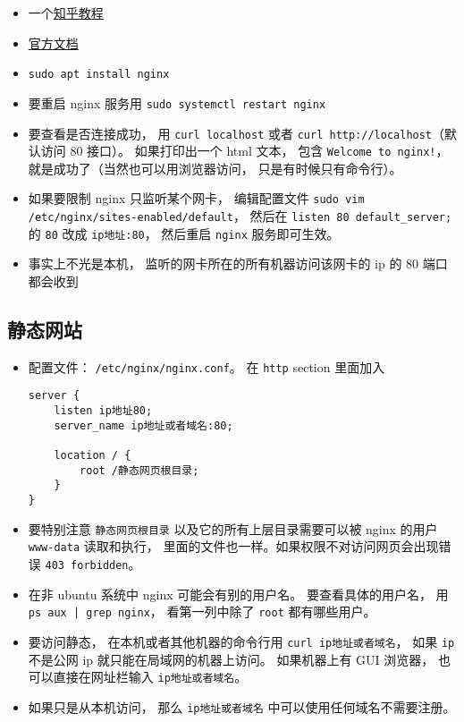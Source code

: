 
\begin{issues}
\issueDraft
\end{issues}

\begin{itemize}
\item 一个\href{https://zhuanlan.zhihu.com/p/80600540}{知乎教程}
\item \href{https://nginx.org/en/docs/}{官方文档}
\item \verb|sudo apt install nginx|
\item 要重启 nginx 服务用 \verb|sudo systemctl restart nginx|
\item 要查看是否连接成功， 用 \verb|curl localhost| 或者 \verb|curl http://localhost|（默认访问 80 接口）。 如果打印出一个 html 文本， 包含 \verb|Welcome to nginx!|， 就是成功了（当然也可以用浏览器访问， 只是有时候只有命令行）。
\item 如果要限制 nginx 只监听某个网卡， 编辑配置文件 \verb|sudo vim /etc/nginx/sites-enabled/default|， 然后在 \verb|listen 80 default_server;| 的 \verb|80| 改成 \verb|ip地址:80|， 然后重启 \verb|nginx| 服务即可生效。
\item 事实上不光是本机， 监听的网卡所在的所有机器访问该网卡的 ip 的 80 端口都会收到
\end{itemize}

\subsection{静态网站}
\begin{itemize}
\item 配置文件： \verb|/etc/nginx/nginx.conf|。 在 \verb|http| section 里面加入
\begin{lstlisting}[language=none]
server {
    listen ip地址80;
    server_name ip地址或者域名:80;
    
    location / {
        root /静态网页根目录;
    }
}
\end{lstlisting}
\item 要特别注意 \verb|静态网页根目录| 以及它的所有上层目录需要可以被 nginx 的用户 \verb|www-data| 读取和执行， 里面的文件也一样。如果权限不对访问网页会出现错误 \verb|403 forbidden|。
\item 在非 ubuntu 系统中 nginx 可能会有别的用户名。  要查看具体的用户名， 用 \verb`ps aux | grep nginx`， 看第一列中除了 \verb|root| 都有哪些用户。
\item 要访问静态， 在本机或者其他机器的命令行用 \verb|curl ip地址或者域名|， 如果 \verb|ip| 不是公网 ip 就只能在局域网的机器上访问。 如果机器上有 GUI 浏览器， 也可以直接在网址栏输入 \verb|ip地址或者域名|。
\item 如果只是从本机访问， 那么 \verb|ip地址或者域名| 中可以使用任何域名不需要注册。
\end{itemize}

